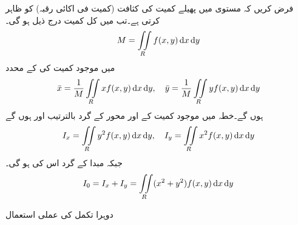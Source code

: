 فرض کریں کہ مستوی  میں پھیلے کمیت کی   کثافت (کمیت فی اکائی رقبہ) کو   ظاہر کرتی ہے۔تب  میں کل کمیت  درج ذیل ہو گی۔
\begin{align*}
M=\iint\limits_R f(x,y)\dif x\dif y
\end{align*}
 میں موجود کمیت کی  کے محدد
\begin{align*}
\bar{x}=\frac{1}{M}\iint\limits_R xf(x,y)\dif x\dif y,\quad \bar{y}=\frac{1}{M}\iint\limits_R yf(x,y)\dif x \dif y
\end{align*}
ہوں گے۔خطہ   میں موجود کمیت کے  اور  محور کے گرد   بالترتیب  اور  ہوں گے
\begin{align*}
I_x=\iint\limits_R y^2f(x,y)\dif x \dif y,\quad I_y=\iint\limits_R x^2f(x,y)\dif x\dif y
\end{align*}
جبکہ مبدا کے گرد اس کی   ہو گی۔
\begin{align*}
I_0=I_x+I_y=\iint\limits_R (x^2+y^2)f(x,y)\dif x\dif y
\end{align*}

\quad دوہرا تکمل کی عملی استعمال\\

